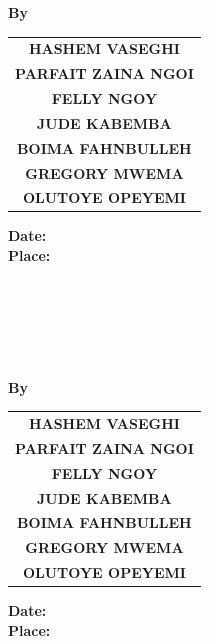 \documentclass[main]{subfiles}
\begin{document}
\centering
\logo \\[3em]
\textbf{\LARGE \universityname} \\[1em]
\textbf{\Large \facultyname} \\[1em]
\textbf{\large \departmentname} \\[3em]
\textbf{\Huge \projecttitle} \\[2em]
\textbf{\Large By} \\[1em]
\begin{tabular}[pos]{c} 
    \textbf{\uppercase{hashem vaseghi}}      \\[0.5em] 
    \textbf{\uppercase{Parfait Zaina Ngoi}}  \\[0.5em]
    \textbf{\uppercase{Felly Ngoy}}          \\[0.5em]
    \textbf{\uppercase{Jude Kabemba}}        \\[0.5em]
    \textbf{\uppercase{Boima Fahnbulleh}}   \\[0.5em]
    \textbf{\uppercase{Gregory Mwema}}     \\[0.5em]
    \textbf{\uppercase{Olutoye Opeyemi}}   \\[0.5em]
\end{tabular}
\vfill
\textbf{ Date: \reportdate} \\[1em]
\textbf{ Place: \reportplace} \\[1em]

\newpage

\centering
\logo \\[3em]
\textbf{\LARGE \universityname} \\[1em]
\textbf{\Large \facultyname} \\[1em]
\textbf{\large \departmentname} \\[3em]
\textbf{\Huge \projecttitle} \\[2em]
\textbf{\Large By} \\[1em]
\begin{tabular}[pos]{c} 
    \textbf{\uppercase{hashem vaseghi}}      \\[0.5em]
    \textbf{\uppercase{Parfait Zaina Ngoi}}  \\ [0.5em]
    \textbf{\uppercase{Felly Ngoy}}          \\ [0.5em] 
    \textbf{\uppercase{Jude Kabemba}}        \\ [0.5em]
    \textbf{\uppercase{Boima Fahnbulleh}}   \\[0.5em]
    \textbf{\uppercase{Gregory Mwema}}     \\[0.5em]
    \textbf{\uppercase{Olutoye Opeyemi}}   \\[0.5em]
\end{tabular}
\vfill
\textbf{ Date: \reportdate} \\[1em]
\textbf{ Place: \reportplace} \\[1em]
\end{document}
